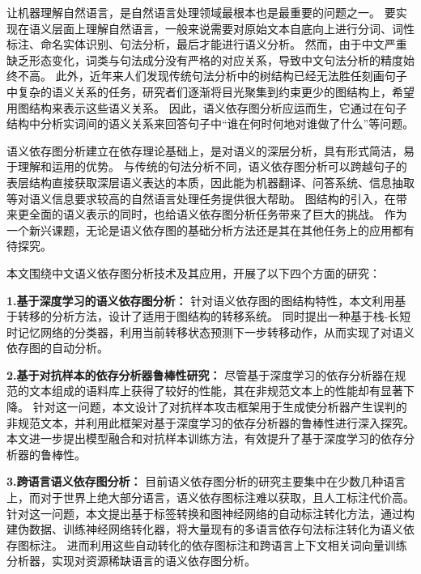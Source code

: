 \begin{cabstract}

让机器理解自然语言，是自然语言处理领域最根本也是最重要的问题之一。
要实现在语义层面上理解自然语言，一般来说需要对原始文本自底向上进行分词、词性标注、命名实体识别、句法分析，最后才能进行语义分析。
然而，由于中文严重缺乏形态变化，词类与句法成分没有严格的对应关系，导致中文句法分析的精度始终不高。
此外，近年来人们发现传统句法分析中的树结构已经无法胜任刻画句子中复杂的语义关系的任务，研究者们逐渐将目光聚集到约束更少的图结构上，希望用图结构来表示这些语义关系。
因此，语义依存图分析应运而生，它通过在句子结构中分析实词间的语义关系来回答句子中“谁在何时何地对谁做了什么”等问题。

语义依存图分析建立在依存理论基础上，是对语义的深层分析，具有形式简洁，易于理解和运用的优势。
与传统的句法分析不同，语义依存图分析可以跨越句子的表层结构直接获取深层语义表达的本质，因此能为机器翻译、问答系统、信息抽取等对语义信息要求较高的自然语言处理任务提供很大帮助。
图结构的引入，在带来更全面的语义表示的同时，也给语义依存图分析任务带来了巨大的挑战。
作为一个新兴课题，无论是语义依存图的基础分析方法还是其在其他任务上的应用都有待探究。

本文围绕中文语义依存图分析技术及其应用，开展了以下四个方面的研究：

\textbf{1.基于深度学习的语义依存图分析：}  
针对语义依存图的图结构特性，本文利用基于转移的分析方法，设计了适用于图结构的转移系统。
同时提出一种基于栈-长短时记忆网络的分类器，利用当前转移状态预测下一步转移动作，从而实现了对语义依存图的自动分析。

\textbf{2.基于对抗样本的依存分析器鲁棒性研究：}
尽管基于深度学习的依存分析器在规范的文本组成的语料库上获得了较好的性能，其在非规范文本上的性能却有显著下降。
针对这一问题，本文设计了对抗样本攻击框架用于生成使分析器产生误判的非规范文本，并利用此框架对基于深度学习的依存分析器的鲁棒性进行深入探究。
本文进一步提出模型融合和对抗样本训练方法，有效提升了基于深度学习的依存分析器的鲁棒性。

\textbf{3.跨语言语义依存图分析：}
目前语义依存图分析的研究主要集中在少数几种语言上，而对于世界上绝大部分语言，语义依存图标注难以获取，且人工标注代价高。
针对这一问题，本文提出基于标签转换和图神经网络的自动标注转化方法，通过构建伪数据、训练神经网络转化器，将大量现有的多语言依存句法标注转化为语义依存图标注。
进而利用这些自动转化的依存图标注和跨语言上下文相关词向量训练分析器，实现对资源稀缺语言的语义依存图分析。


\end{cabstract}
